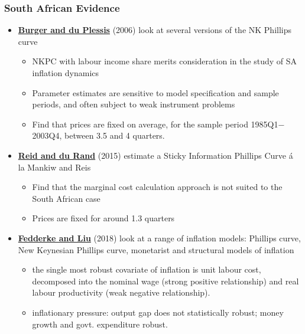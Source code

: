 \documentclass[10pt, xcolor=x11names, table]{beamer}
\begin{document}
\begin{frame}
\frametitle{South African Evidence}
\begin{itemize}
\item \href{https://www.resbank.co.za/content/dam/sarb/publications/conference-papers/2007/56/Du+Plessis.pdf}{\textbf{Burger and du Plessis}} (2006) look at several versions of the NK Phillips curve
\begin{itemize}
\item NKPC with labour income share merits consideration in the study of SA inflation dynamics
\item Parameter estimates are sensitive to model specification and sample periods, and often subject to weak instrument problems
\item Find that prices are fixed on average, for the sample period 1985Q1$-$2003Q4, between 3.5 and 4 quarters. 
\end{itemize}
\item \href{https://doi.org/10.1111/saje.12066}{\textbf{Reid and du Rand}} (2015) estimate a Sticky Information Phillips Curve {\'{a}} la Mankiw and Reis
\begin{itemize}
\item Find that the marginal cost calculation approach is not suited to the South African case
\item Prices are fixed for around 1.3 quarters
\end{itemize}
\item \href{https://doi.org/10.1111/saje.12192}{\textbf{Fedderke and Liu}} (2018) look at a range of inflation models: Phillips curve, New Keynesian Phillips curve, monetarist and structural models of inflation
\begin{itemize}
\item the single most robust covariate of inflation is unit labour cost, decomposed into the nominal wage (strong positive relationship) and real labour productivity (weak negative relationship).
\item  inflationary pressure: output gap does not statistically robust; money growth and govt. expenditure robust.
\end{itemize}
\end{itemize}
\end{frame}
\end{document}
